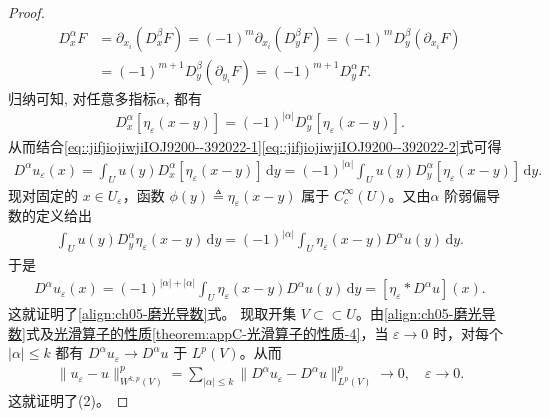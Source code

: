 \documentclass[../../main.tex]{subfiles}
\begin{document}
\begin{proof}
\begin{align*}
D_x^\alpha F
&=\partial_{x_i}(D_x^\beta F)=(-1)^m\partial_{x_i}(D_y^\beta F)=(-1)^mD_y^\beta(\partial_{x_i}F)\\
&=(-1)^{m+1}D_y^\beta(\partial_{y_i}F)=(-1)^{m+1}D_y^\alpha F.
\end{align*}
归纳可知, 对任意多指标$\alpha$, 都有
\begin{align}\label{eq::jifjiojiwjiIOJ9200--392022-2}
D_x^\alpha[\eta_\varepsilon(x-y)]
=(-1)^{|\alpha|}D_y^\alpha[\eta_\varepsilon(x-y)].
\end{align}
从而结合\eqref{eq::jifjiojiwjiIOJ9200--392022-1}\eqref{eq::jifjiojiwjiIOJ9200--392022-2}式可得
\begin{align*}
D^{\alpha}u_{\varepsilon}\left( x \right) = \int_Uu(y)D_x^\alpha[\eta_\varepsilon(x-y)]\,\mathrm{d}y
=(-1)^{|\alpha|}
\int_Uu(y)D_y^\alpha[\eta_\varepsilon(x-y)]\,\mathrm{d}y.
\end{align*}
现对固定的 $x\in U_{\varepsilon}$，函数 $\phi(y)\triangleq\eta_{\varepsilon}(x-y)$ 属于 $C^{\infty}_{c}(U)$。又由$\alpha$ 阶弱偏导数的定义给出
\begin{align*}
\int_{U}u(y)D_{y}^{\alpha}\eta_{\varepsilon}(x-y)\,\mathrm{d}y
=(-1)^{|\alpha|}\int_{U}\eta_{\varepsilon}(x-y)D^{\alpha}u(y)\,\mathrm{d}y.
\end{align*}
于是
\begin{align*}
D^{\alpha}u_{\varepsilon}(x)
=(-1)^{|\alpha|+|\alpha|}\int_{U}\eta_{\varepsilon}(x-y)D^{\alpha}u(y)\,\mathrm{d}y
=[\eta_{\varepsilon}*D^{\alpha}u](x).
\end{align*}
这就证明了\eqref{align:ch05-磨光导数}式。
现取开集 $V\subset \subset U$。由\eqref{align:ch05-磨光导数}式及\hyperref[theorem:appC-光滑算子的性质]{光滑算子的性质\ref{theorem:appC-光滑算子的性质-4}}，当 $\varepsilon\to 0$ 时，对每个 $|\alpha|\leqslant k$ 都有 $D^{\alpha}u_{\varepsilon}\to D^{\alpha}u$ 于 $L^{p}(V)$。从而
\begin{align*}
\|u_{\varepsilon}-u\|_{W^{k,p}(V)}^{p}
=\sum_{|\alpha|\leqslant k}\|D^{\alpha}u_{\varepsilon}-D^{\alpha}u\|_{L^{p}(V)}^{p}\to 0,\quad \varepsilon\to 0.
\end{align*}
这就证明了(2)。
\end{proof}
\end{document}
